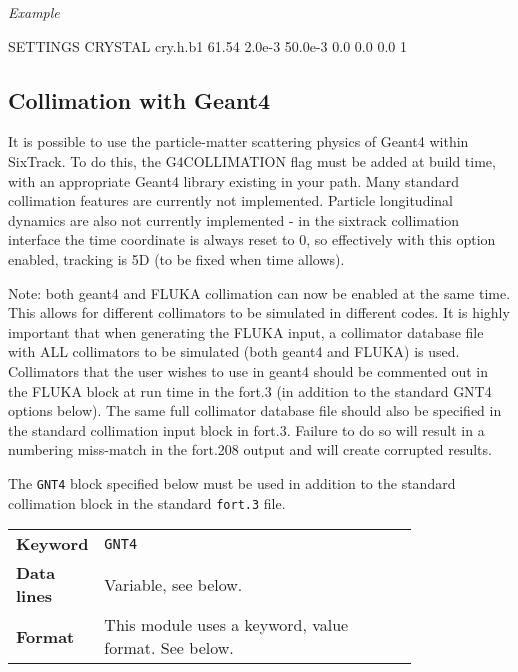 \bigskip
\noindent\textit{Example}
\begin{cverbatim}
SETTINGS
CRYSTAL  cry.h.b1 61.54 2.0e-3 50.0e-3 0.0 0.0 0.0 1
\end{cverbatim}


\subsection{Collimation with Geant4}

It is possible to use the particle-matter scattering physics of Geant4 within SixTrack.
To do this, the G4COLLIMATION flag must be added at build time, with an appropriate Geant4 library existing in your path.
Many standard collimation features are currently not implemented.
Particle longitudinal dynamics are also not currently implemented - in the sixtrack collimation interface the time coordinate is always reset to 0, so effectively with this option enabled, tracking is 5D (to be fixed when time allows).

Note: both geant4 and FLUKA collimation can now be enabled at the same time.
This allows for different collimators to be simulated in different codes.
It is highly important that when generating the FLUKA input, a collimator database file with ALL collimators to be simulated (both geant4 and FLUKA) is used.
Collimators that the user wishes to use in geant4 should be commented out in the FLUKA block at run time in the fort.3 (in addition to the standard GNT4 options below).
The same full collimator database file should also be specified in the standard collimation input block in fort.3.
Failure to do so will result in a numbering miss-match in the fort.208 output and will create corrupted results.

The \texttt{GNT4} block specified below must be used in addition to the standard collimation block in the standard \texttt{fort.3} file.  

\bigskip
\begin{tabular}{@{}lp{0.8\linewidth}}
    \textbf{Keyword}    & \texttt{GNT4}\index{GNT4} \\
    \textbf{Data lines} & Variable, see below. \\
    \textbf{Format}     & This module uses a keyword, value format. See below.
\end{tabular}

